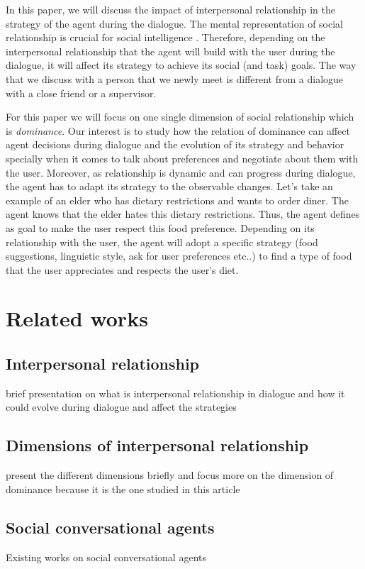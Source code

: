 \documentclass{llncs}
\begin{document}
In this paper, we will discuss the impact of interpersonal relationship in the strategy of the agent during the dialogue. The mental representation of social relationship is crucial for social intelligence \cite{haslam1994mental}. Therefore, depending on the interpersonal relationship that the agent will build with the user during the dialogue, it will affect its strategy to achieve its social (and task) goals. The way that we discuss with a person that we newly meet is different from a dialogue with a close friend or a supervisor. 
\par For this paper we will focus on one single dimension of social relationship which is \textit{dominance}. Our interest is to study how the relation of dominance can affect agent decisions during dialogue and the evolution of its strategy and behavior specially when it comes to talk about preferences and negotiate about them with the user. Moreover, as relationship is dynamic and can progress during dialogue, the agent has to adapt its strategy to the observable changes. Let's take an example of an elder  who has dietary restrictions and wants to order diner. The agent knows that the elder hates this dietary restrictions. Thus, the agent defines as goal to make the user respect this food preference. Depending on its relationship with the user, the agent will adopt a specific strategy (food suggestions, linguistic style, ask for user preferences etc..) to find a type of food that the user appreciates and respects the user's diet.



\section{Related works}
\subsection{Interpersonal relationship}
brief presentation on what is interpersonal relationship in dialogue and how it could evolve during dialogue and affect the strategies
\subsection{Dimensions of interpersonal relationship}
present the different dimensions briefly and focus more on the dimension of dominance because it is the one studied in this article
\subsection{Social conversational agents}
 Existing works on social conversational agents
\noindent 
\vskip 4pt


\end{document}
